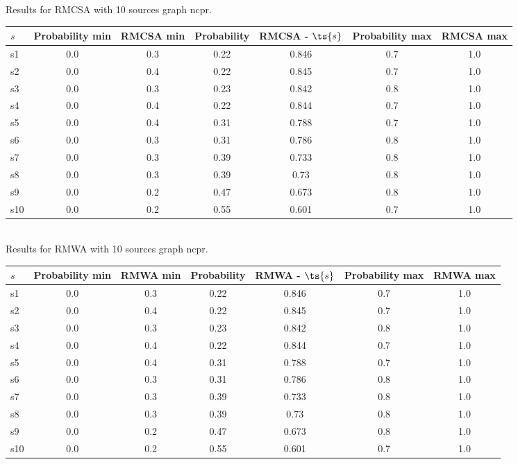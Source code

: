 \documentclass{article}
\begin{document}
\noindent Results for RMCSA with 10 sources graph ncpr.

\noindent\begin{tabular}{|l|c|c|c|c|c|c|}
\hline
$s$& Probability min & RMCSA min & Probability & RMCSA - $\ts{s}$ & Probability max & RMCSA max\\
\hline
s1 &0.0 & 0.3 & 0.22 & 0.846 & 0.7 & 1.0\\
\hline
s2 &0.0 & 0.4 & 0.22 & 0.845 & 0.7 & 1.0\\
\hline
s3 &0.0 & 0.3 & 0.23 & 0.842 & 0.8 & 1.0\\
\hline
s4 &0.0 & 0.4 & 0.22 & 0.844 & 0.7 & 1.0\\
\hline
s5 &0.0 & 0.4 & 0.31 & 0.788 & 0.7 & 1.0\\
\hline
s6 &0.0 & 0.3 & 0.31 & 0.786 & 0.8 & 1.0\\
\hline
s7 &0.0 & 0.3 & 0.39 & 0.733 & 0.8 & 1.0\\
\hline
s8 &0.0 & 0.3 & 0.39 & 0.73 & 0.8 & 1.0\\
\hline
s9 &0.0 & 0.2 & 0.47 & 0.673 & 0.8 & 1.0\\
\hline
s10 &0.0 & 0.2 & 0.55 & 0.601 & 0.7 & 1.0\\
\hline
\end{tabular}\\

\noindent Results for RMWA with 10 sources graph ncpr.

\noindent\begin{tabular}{|l|c|c|c|c|c|c|}
\hline
$s$& Probability min & RMWA min & Probability & RMWA - $\ts{s}$ & Probability max & RMWA max\\
\hline
s1 &0.0 & 0.3 & 0.22 & 0.846 & 0.7 & 1.0\\
\hline
s2 &0.0 & 0.4 & 0.22 & 0.845 & 0.7 & 1.0\\
\hline
s3 &0.0 & 0.3 & 0.23 & 0.842 & 0.8 & 1.0\\
\hline
s4 &0.0 & 0.4 & 0.22 & 0.844 & 0.7 & 1.0\\
\hline
s5 &0.0 & 0.4 & 0.31 & 0.788 & 0.7 & 1.0\\
\hline
s6 &0.0 & 0.3 & 0.31 & 0.786 & 0.8 & 1.0\\
\hline
s7 &0.0 & 0.3 & 0.39 & 0.733 & 0.8 & 1.0\\
\hline
s8 &0.0 & 0.3 & 0.39 & 0.73 & 0.8 & 1.0\\
\hline
s9 &0.0 & 0.2 & 0.47 & 0.673 & 0.8 & 1.0\\
\hline
s10 &0.0 & 0.2 & 0.55 & 0.601 & 0.7 & 1.0\\
\hline
\end{tabular}\\
\end{document}
